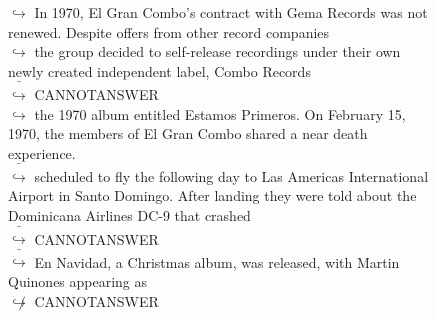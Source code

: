\documentclass[11pt,a4paper, onecolumn]{article}
\begin{document}
\begin{figure}[t] \small \begin{tcolorbox}[boxsep=0pt,left=5pt,right=0pt,top=2pt,colback = yellow!5] \begin{dialogue}
 \small 
\colorbox{pink!25}{$\hookrightarrow$}
{ In 1970, El Gran Combo's contract with Gema Records was not renewed. Despite offers from other record companies }
\\
\colorbox{pink!25}{$\hookrightarrow$}
{ the group decided to self-release recordings under their own newly created independent label, Combo Records }
\\
\colorbox{pink!25}{ $\bar{\hookrightarrow}$}
{ CANNOTANSWER }
\\
\colorbox{pink!25}{$\hookrightarrow$}
{ the 1970 album entitled Estamos Primeros. On February 15, 1970, the members of El Gran Combo shared a near death experience. }
\\
\colorbox{pink!25}{ $\bar{\hookrightarrow}$}
{ scheduled to fly the following day to Las Americas International Airport in Santo Domingo. After landing they were told about the Dominicana Airlines DC-9 that crashed }
\\
\colorbox{pink!25}{ $\bar{\hookrightarrow}$}
{ CANNOTANSWER }
\\
\colorbox{pink!25}{ $\bar{\hookrightarrow}$}
{ En Navidad, a Christmas album, was released, with Martin Quinones appearing as }
\\
\colorbox{pink!25}{$\not\hookrightarrow$}
{ CANNOTANSWER }
 \end{dialogue}\end{tcolorbox}\end{figure}
\end{document}
